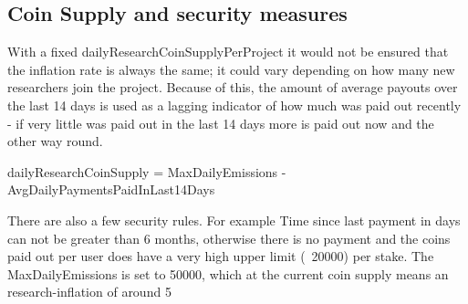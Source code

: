 \subsection{Coin Supply and security measures}

With a fixed dailyResearchCoinSupplyPerProject it would not be ensured that the inflation rate is always the same; it could vary depending on how many new researchers join the project. Because of this, the amount of average payouts over the last 14 days is used as a lagging indicator of how much was paid out recently - if very little was paid out in the last 14 days more is paid out now and the other way round.

dailyResearchCoinSupply = MaxDailyEmissions - AvgDailyPaymentsPaidInLast14Days

There are also a few security rules. For example Time since last payment in days can not be greater than 6 months, otherwise there is no payment and the coins paid out per user does have a very high upper limit (~20000)  per stake.
The MaxDailyEmissions is set to 50000, which at the current coin supply means an research-inflation of around 5%

